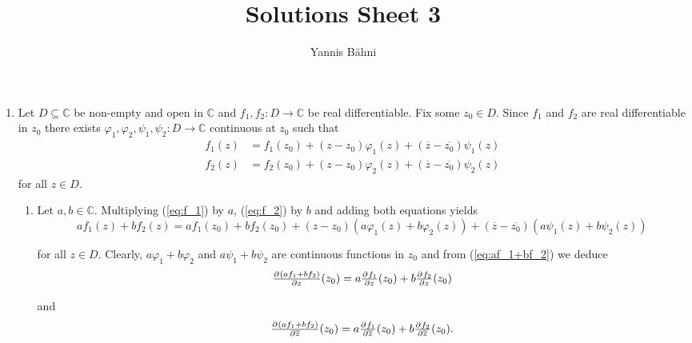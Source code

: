 

\title{Solutions Sheet 3}
\author{Yannis B\"{a}hni}
\address[Yannis B\"{a}hni]{University of Zurich, R\"{a}mistrasse 71, 8006 Zurich}


\maketitle
\thispagestyle{fancy}
\begin{enumerate}[label = \textbf{Exercise \arabic*.},wide = 0pt, itemsep=1.5ex]
	\item 
		Let $D \subseteq \mathbb{C}$ be non-empty and open in $\mathbb{C}$ and $f_1,f_2: D \to \mathbb{C}$ be real differentiable. Fix some $z_0 \in D$. Since $f_1$ and $f_2$ are real differentiable in $z_0$ there exists $\varphi_1,\varphi_2,\psi_1,\psi_2: D \to \mathbb{C}$ continuous at $z_0$ such that
				\begin{align}
					f_1(z) &= f_1(z_0) + (z - z_0)\varphi_1(z) + (\overline{z} - \overline{z_0})\psi_1(z)\label{eq:f_1}\\
					f_2(z) &= f_2(z_0) + (z - z_0)\varphi_2(z) + (\overline{z} - \overline{z_0})\psi_2(z)\label{eq:f_2}
				\end{align}
				\noindent for all $z \in D$.
		\begin{enumerate}[label = (\roman*),wide = 0pt, itemsep=1.5ex]
			\item Let $a,b \in \mathbb{C}$. Multiplying (\ref{eq:f_1}) by $a$, (\ref{eq:f_2}) by $b$ and adding both equations yields
				\begin{equation}
					af_1(z) + bf_2(z) = af_1(z_0) + bf_2(z_0) + (z - z_0)(a\varphi_1(z) + b\varphi_2(z)) + (\overline{z} - \overline{z_0})(a\psi_1(z) + b\psi_2(z))
					\label{eq:af_1+bf_2}
				\end{equation} 

				\noindent for all $z \in D$. Clearly, $a\varphi_1 + b \varphi_2$ and $a\psi_1 + b\psi_2$ are continuous functions in $z_0$ and from (\ref{eq:af_1+bf_2}) we deduce
				\begin{equation}
					\pd{(af_1 + bf_2)}{z}(z_0) = a\pd{f_1}{z}(z_0) + b\pd{f_2}{z}(z_0)
				\end{equation}

				\noindent and
				\begin{equation}
					\pd{(af_1 + bf_2)}{\overline{z}}(z_0) = a\pd{f_1}{\overline{z}}(z_0) + b\pd{f_2}{\overline{z}}(z_0).
				\end{equation}


\end{enumerate}
\end{enumerate}
